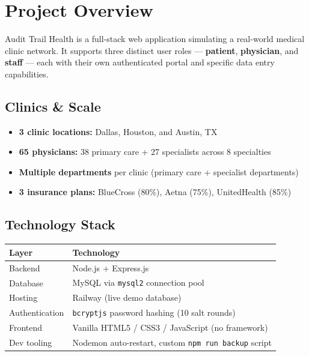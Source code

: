 \documentclass[12pt, letterpaper]{article}
\begin{document}
\tableofcontents
\newpage

\section{Project Overview}

Audit Trail Health is a full-stack web application simulating a real-world medical clinic network. It supports three distinct user roles — \textbf{patient}, \textbf{physician}, and \textbf{staff} — each with their own authenticated portal and specific data entry capabilities.

\subsection{Clinics \& Scale}
\begin{itemize}
  \item \textbf{3 clinic locations:} Dallas, Houston, and Austin, TX
  \item \textbf{65 physicians:} 38 primary care + 27 specialists across 8 specialties
  \item \textbf{Multiple departments} per clinic (primary care + specialist departments)
  \item \textbf{3 insurance plans:} BlueCross (80\%), Aetna (75\%), UnitedHealth (85\%)
\end{itemize}

\subsection{Technology Stack}
\begin{center}
\begin{tabular}{ll}
  \toprule
  \textbf{Layer}      & \textbf{Technology} \\
  \midrule
  Backend             & Node.js + Express.js \\
  Database            & MySQL via \texttt{mysql2} connection pool \\
  Hosting             & Railway (live demo database) \\
  Authentication      & \texttt{bcryptjs} password hashing (10 salt rounds) \\
  Frontend            & Vanilla HTML5 / CSS3 / JavaScript (no framework) \\
  Dev tooling         & Nodemon auto-restart, custom \texttt{npm run backup} script \\
  \bottomrule
\end{tabular}
\end{center}
\end{document}
